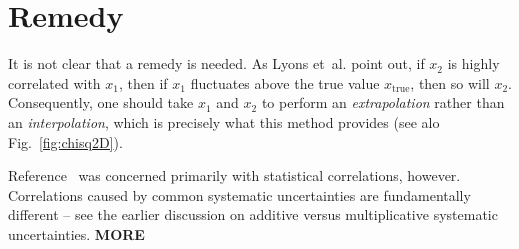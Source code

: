 \documentclass[11pt]{article}
\newcommand{\xtrue} {x_{\mathrm{true}}}
\newcommand{\xa}   {x_1}
\newcommand{\xb}   {x_2}
\begin{document}
\section{Remedy}
\par
It is not clear that a remedy is needed.   As Lyons et~al. point out, if
$\xb$ is highly correlated with $\xa$, then if $\xa$ fluctuates above
the true value $\xtrue$, then so will $\xb$.   Consequently, one should
take $\xa$ and $\xb$ to perform an {\em extrapolation} rather than an
{\em interpolation}, which is precisely what this method provides
(see alo Fig.~\ref{fig:chisq2D}).
\par
Reference~\cite{Lyons} was concerned primarily with statistical correlations,
however.  Correlations caused by common systematic uncertainties are
fundamentally different -- see the earlier discussion on additive versus
multiplicative systematic uncertainties.  
{\bf MORE}



\newpage
\end{document}
